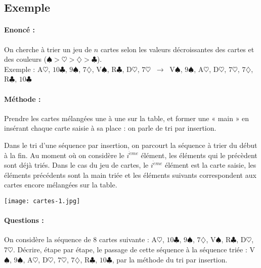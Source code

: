 \subsection{Exemple}

\paragraph{Enoncé :} On cherche à trier un jeu de $n$ cartes selon les valeurs 
décroissantes des cartes et des couleurs ($\spadesuit > \heartsuit > \diamondsuit > \clubsuit$).\\
Exemple : 
A$\heartsuit$, $10\clubsuit$, $9\spadesuit$, $7\diamondsuit$, V$\spadesuit$, R$\clubsuit$, D$\heartsuit$, $7\heartsuit$
$\ \longrightarrow\ $ 
V$\spadesuit$, $9\spadesuit$, A$\heartsuit$, D$\heartsuit$, $7\heartsuit$, $7\diamondsuit$, R$\clubsuit$, $10\clubsuit$
\vspace*{3mm}

\noindent\begin{minipage}{9cm}
\paragraph{Méthode :} Prendre les cartes mélangées une à une sur la table, 
et former une « main » en insérant chaque carte saisie à sa place : on parle de tri par
insertion.

Dans le tri d'une séquence par insertion, on parcourt la séquence à trier du début à la fin. 
Au moment où on considère le $i^{\grave{e}me}$ élément, les éléments qui le précèdent sont déjà triés. Dans le cas du jeu de cartes, le $i^{\grave{e}me}$ élément est la carte saisie, les éléments précédents sont la main triée et les éléments suivants correspondent aux cartes encore mélangées sur la table.

\end{minipage}
\hfill
\begin{minipage}{6cm}
\centerline{\texttt{[image: cartes-1.jpg]}}
\end{minipage}




\paragraph{Questions :} \mbox{}

\begin{question}\mbox{}
On considère la séquence de 8 cartes suivante : A$\heartsuit$, $10\clubsuit$, $9\spadesuit$, $7\diamondsuit$, V$\spadesuit$, R$\clubsuit$, D$\heartsuit$, $7\heartsuit$. 
Décrire, étape par étape,
le passage de cette séquence à la séquence triée : V$\spadesuit$, $9\spadesuit$, A$\heartsuit$, D$\heartsuit$, $7\heartsuit$, $7\diamondsuit$, R$\clubsuit$, $10\clubsuit$,
par la méthode du tri par insertion.
\end{question}

